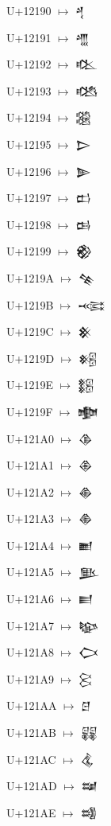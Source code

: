 {\noindent U+12190  $\mapsto$ {\cufont 𒆐}\par
\noindent U+12191  $\mapsto$ {\cufont 𒆑}\par
\noindent U+12192  $\mapsto$ {\cufont 𒆒}\par
\noindent U+12193  $\mapsto$ {\cufont 𒆓}\par
\noindent U+12194  $\mapsto$ {\cufont 𒆔}\par
\noindent U+12195  $\mapsto$ {\cufont 𒆕}\par
\noindent U+12196  $\mapsto$ {\cufont 𒆖}\par
\noindent U+12197  $\mapsto$ {\cufont 𒆗}\par
\noindent U+12198  $\mapsto$ {\cufont 𒆘}\par
\noindent U+12199  $\mapsto$ {\cufont 𒆙}\par
\noindent U+1219A  $\mapsto$ {\cufont 𒆚}\par
\noindent U+1219B  $\mapsto$ {\cufont 𒆛}\par
\noindent U+1219C  $\mapsto$ {\cufont 𒆜}\par
\noindent U+1219D  $\mapsto$ {\cufont 𒆝}\par
\noindent U+1219E  $\mapsto$ {\cufont 𒆞}\par
\noindent U+1219F  $\mapsto$ {\cufont 𒆟}\par
\noindent U+121A0  $\mapsto$ {\cufont 𒆠}\par
\noindent U+121A1  $\mapsto$ {\cufont 𒆡}\par
\noindent U+121A2  $\mapsto$ {\cufont 𒆢}\par
\noindent U+121A3  $\mapsto$ {\cufont 𒆣}\par
\noindent U+121A4  $\mapsto$ {\cufont 𒆤}\par
\noindent U+121A5  $\mapsto$ {\cufont 𒆥}\par
\noindent U+121A6  $\mapsto$ {\cufont 𒆦}\par
\noindent U+121A7  $\mapsto$ {\cufont 𒆧}\par
\noindent U+121A8  $\mapsto$ {\cufont 𒆨}\par
\noindent U+121A9  $\mapsto$ {\cufont 𒆩}\par
\noindent U+121AA  $\mapsto$ {\cufont 𒆪}\par
\noindent U+121AB  $\mapsto$ {\cufont 𒆫}\par
\noindent U+121AC  $\mapsto$ {\cufont 𒆬}\par
\noindent U+121AD  $\mapsto$ {\cufont 𒆭}\par
\noindent U+121AE  $\mapsto$ {\cufont 𒆮}\par
}
